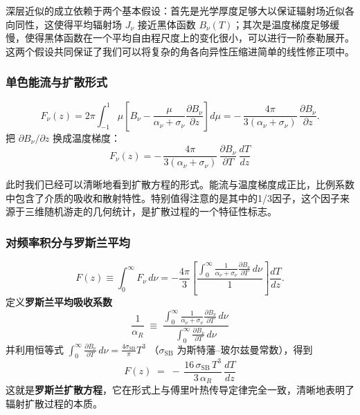 \begin{derivationnote}[近似的两条关键假设]
深层近似的成立依赖于两个基本假设：首先是光学厚度足够大以保证辐射场近似各向同性，这使得平均辐射场 $J_\nu$ 接近黑体函数 $B_\nu(T)$；其次是温度梯度足够缓慢，使得黑体函数在一个平均自由程尺度上的变化很小，可以进行一阶泰勒展开。这两个假设共同保证了我们可以将复杂的角各向异性压缩进简单的线性修正项中。
\end{derivationnote}

\subsubsection*{单色能流与扩散形式}


\[
F_\nu(z)
= 2\pi \int_{-1}^1 \mu \left[B_\nu - \frac{\mu}{\alpha_\nu+\sigma_\nu}\frac{\partial B_\nu}{\partial z}\right] d\mu
= -\,\frac{4\pi}{3(\alpha_\nu+\sigma_\nu)}\,\frac{\partial B_\nu}{\partial z}.
\]
把 $\partial B_\nu/\partial z$ 换成温度梯度：
\[
\boxed{
F_\nu(z) = -\,\frac{4\pi}{3(\alpha_\nu+\sigma_\nu)}\,
\frac{\partial B_\nu}{\partial T}\,\frac{dT}{dz}
}
\]

此时我们已经可以清晰地看到扩散方程的形式。能流与温度梯度成正比，比例系数中包含了介质的吸收和散射特性。特别值得注意的是其中的1/3因子，这个因子来源于三维随机游走的几何统计，是扩散过程的一个特征性标志。

\subsubsection*{对频率积分与罗斯兰平均}


\[
F(z) \equiv \int_0^\infty F_\nu\, d\nu
= -\frac{4\pi}{3}\left[
\frac{\displaystyle \int_0^\infty 
\frac{1}{\alpha_\nu+\sigma_\nu}\frac{\partial B_\nu}{\partial T}\, d\nu}
{\displaystyle 1}
\right]\frac{dT}{dz}.
\]
定义\textbf{罗斯兰平均吸收系数}
\[
\boxed{
\frac{1}{\alpha_R} \;\equiv\;
\frac{\displaystyle \int_0^\infty \frac{1}{\alpha_\nu+\sigma_\nu}
\frac{\partial B_\nu}{\partial T} \, d\nu}
{\displaystyle \int_0^\infty \frac{\partial B_\nu}{\partial T} \, d\nu}
}
\]
并利用恒等式
\(
\displaystyle \int_0^\infty \frac{\partial B_\nu}{\partial T}\, d\nu
= \frac{4\sigma_\mathrm{SB}}{\pi} T^3
\)
（$\sigma_\mathrm{SB}$ 为斯特藩–玻尔兹曼常数），得到
\[
\boxed{
F(z) \;=\; -\,\frac{16\,\sigma_\mathrm{SB}\, T^3}{3\,\alpha_R}\,\frac{dT}{dz}
}
\]
这就是\textbf{罗斯兰扩散方程}，它在形式上与傅里叶热传导定律完全一致，清晰地表明了辐射扩散过程的本质。

